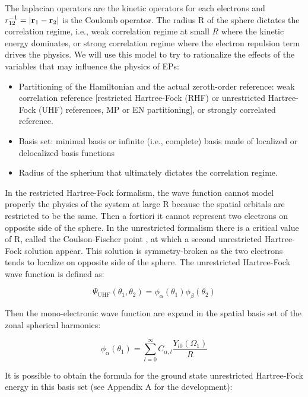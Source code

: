 \documentclass[11pt,a4paper]{article}
\begin{document}
The laplacian operators are the kinetic operators for each electrons and $r_{12}^{-1} = \abs{\vb{r}_1 - \vb{r}_2}$ is the Coulomb operator. The radius R of the sphere dictates the correlation regime, i.e., weak correlation regime at small $R$ where the kinetic energy dominates, or strong correlation regime where the electron repulsion term drives the physics. We will use this model to try to rationalize the effects of the variables that may influence the physics of EPs:
\begin{itemize}
	\item Partitioning of the Hamiltonian and the actual zeroth-order reference: weak correlation reference [restricted Hartree-Fock (RHF) or unrestricted Hartree-Fock (UHF) references, MP or EN partitioning], or strongly correlated reference.
	\item Basis set: minimal basis or infinite (i.e., complete) basis made of localized or delocalized basis functions
	\item Radius of the spherium that ultimately dictates the correlation regime.
\end{itemize}

In the restricted Hartree-Fock formalism, the wave function cannot model properly the physics of the system at large R because the spatial orbitals are restricted to be the same. Then a fortiori it cannot represent two electrons on opposite side of the sphere. In the unrestricted formalism there is a critical value of R, called the Coulson-Fischer point \cite{Coulson_1949}, at which a second unrestricted Hartree-Fock solution appear. This solution is symmetry-broken as the two electrons tends to localize on opposite side of the sphere. The unrestricted Hartree-Fock wave function is defined as:

\begin{equation}\label{eq:UHF_WF}
\Psi_{\text{UHF}}(\theta_1,\theta_2)=\phi_\alpha(\theta_1)\phi_\beta(\theta_2)
\end{equation}

Then the mono-electronic wave function are expand in the spatial basis set of the zonal spherical harmonics:

\begin{equation}
\phi_\alpha(\theta_1)=\sum\limits_{l=0}^{\infty}C_{\alpha,l}\frac{Y_{l0}(\Omega_1)}{R}
\end{equation}

It is possible to obtain the formula for the ground state unrestricted Hartree-Fock energy in this basis set (see Appendix A for the development):
\end{document}
